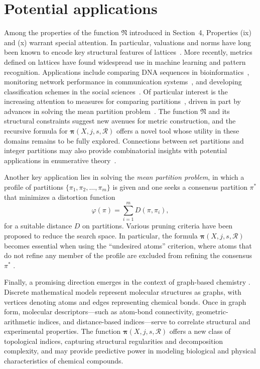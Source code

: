 \documentclass[12pt]{extarticle}
\begin{document}
	
	\section{Potential applications}
	
Among the properties of the function $\mathfrak{N}$ introduced in Section~4, Properties (ix) and (x) warrant special attention. In particular, valuations and norms have long been known to encode key structural features of lattices~\cite{Roman}. More recently, metrics defined on lattices have found widespread use in machine learning and pattern recognition. Applications include comparing DNA sequences in bioinformatics~\cite{biology,couthino}, monitoring network performance in communication systems~\cite{networks}, and developing classification schemes in the social sciences~\cite{Metrics}. Of particular interest is the increasing attention to measures for comparing partitions~\cite{meila3,meila4,ShortestPathJyrko}, driven in part by advances in solving the mean partition problem~\cite{LeclercPartitions,strehl-ghosh}. The function $\mathfrak{N}$ and its structural constraints suggest new avenues for metric construction, and the recursive formula for $\bm{\pi}(X,j,s,\mathcal{R})$ offers a novel tool whose utility in these domains remains to be fully explored. Connections between set partitions and integer partitions may also provide combinatorial insights with potential applications in enumerative theory~\cite{Brown,Butler}.

Another key application lies in solving the \emph{mean partition problem}, in which a profile of partitions $\{\pi_1, \pi_2, \ldots, \pi_m\}$ is given and one seeks a consensus partition $\pi^{\ast}$ that minimizes a distortion function
\[
\varphi(\pi) = \sum_{i=1}^m D(\pi, \pi_i),
\]
for a suitable distance \( D \) on partitions. Various pruning criteria have been proposed to reduce the search space. In particular, the formula $\bm{\pi}(X,j,s,\mathcal{R})$ becomes essential when using the ``undesired atoms” criterion, where atoms that do not refine any member of the profile are excluded from refining the consensus $\pi^{\ast}$ \cite{correareduction}.

Finally, a promising direction emerges in the context of graph-based chemistry \cite{topologicalchemistry}. Discrete mathematical models represent molecular structures as graphs, with vertices denoting atoms and edges representing chemical bonds. Once in graph form, molecular descriptors—such as atom-bond connectivity, geometric-arithmetic indices, and distance-based indices—serve to correlate structural and experimental properties. The function $\bm{\pi}(X,j,s,\mathcal{R})$ offers a new class of topological indices, capturing structural regularities and decomposition complexity, and may provide predictive power in modeling biological and physical characteristics of chemical compounds.
\end{document}
